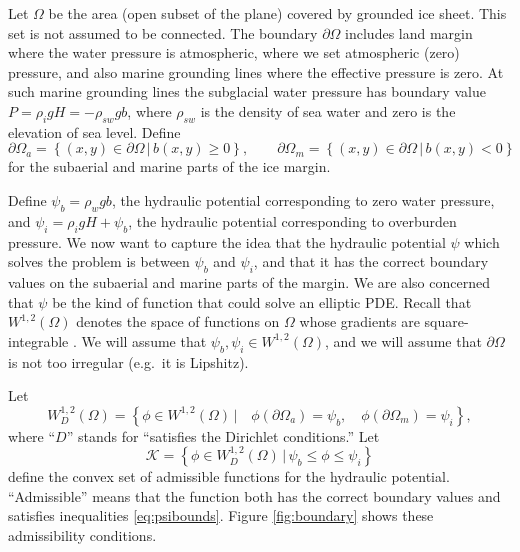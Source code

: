 \documentclass[11pt]{amsart}
\begin{document}
Let $\Omega$ be the area (open subset of the plane) covered by grounded ice sheet.  This set is not assumed to be connected.  The boundary $\partial\Omega$ includes land margin where the water pressure is atmospheric, where we set atmospheric (zero) pressure, and also marine grounding lines where the effective pressure is zero.  At such marine grounding lines the subglacial water pressure has boundary value $P= \rho_i g H = -\rho_{sw} g b$, where $\rho_{sw}$ is the density of sea water and zero is the elevation of sea level.  Define
	$$\partial \Omega_a = \left\{(x,y)\in \partial \Omega  \, \big| \, b(x,y) \ge 0\right\}, \qquad \partial \Omega_m = \left\{(x,y)\in \partial \Omega  \, \big| \, b(x,y) < 0\right\}$$
for the subaerial and marine parts of the ice margin.

Define $\psi_b = \rho_w g b$, the hydraulic potential corresponding to zero water pressure, and $\psi_i = \rho_i g H + \psi_b$, the hydraulic potential corresponding to overburden pressure.  We now want to capture the idea that the hydraulic potential $\psi$ which solves the problem is between $\psi_b$ and $\psi_i$, and that it has the correct boundary values on the subaerial and marine parts of the margin.  We are also concerned that $\psi$ be the kind of function that could solve an elliptic PDE.  Recall that $W^{1,2}(\Omega)$ denotes the space of functions on $\Omega$ whose gradients are square-integrable \citep{Evans}.  We will assume that $\psi_b, \psi_i \in W^{1,2}(\Omega)$, and we will assume that $\partial \Omega$ is not too irregular (e.g.~it is Lipshitz).

Let
	$$W^{1,2}_D(\Omega) = \left\{\phi \in W^{1,2}(\Omega) \, \big| \quad \phi(\partial \Omega_a) = \psi_b, \quad \phi(\partial \Omega_m) = \psi_i\right\},$$
where ``$D$'' stands for ``satisfies the Dirichlet conditions.''  Let
\begin{equation}\label{eq:admissible}
	\mathcal{K} = \left\{\phi \in W^{1,2}_D(\Omega) \, \big| \, \psi_b \le \phi \le \psi_i\right\}
\end{equation}
define the convex set of admissible functions for the hydraulic potential.  ``Admissible'' means that the function both has the correct boundary values and satisfies inequalities \eqref{eq:psibounds}.  Figure \ref{fig:boundary} shows these admissibility conditions.
\end{document}
